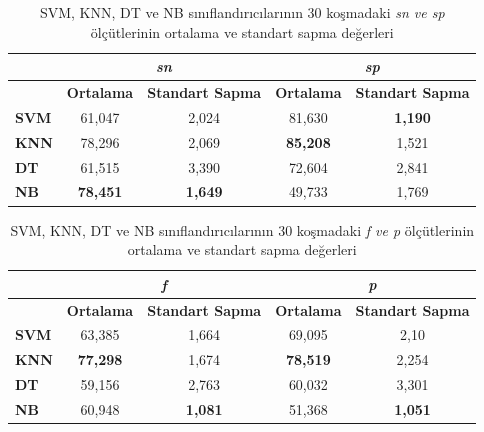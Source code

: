 \documentclass[conference]{IEEEtran}
\begin{document}
\begin{table}[h]
	\centering
	\begin{tabular}{|l|c|c|c|c|}
		\hline
		\multicolumn{1}{|c|}{} & \multicolumn{2}{c|}{\textit{\textbf{sn}}}      & \multicolumn{2}{c|}{\textit{\textbf{sp}}}      \\ \hline
		\multicolumn{1}{|c|}{} & \textbf{Ortalama}    & \textbf{Standart Sapma} & \textbf{Ortalama}    & \textbf{Standart Sapma} \\ \hline
		\textbf{SVM}           & 61,047          & 2,024             & 81,630          & \textbf{1,190}    \\ \hline
		\textbf{KNN}           & 78,296         & 2,069            & \textbf{85,208} & 1,521            \\ \hline
		\textbf{DT}            & 61,515          & 3,390              & 72,604           & 2,841            \\ \hline
		\textbf{NB}            & \textbf{78,451} & \textbf{1,649}    & 49,733         & 1,769             \\ \hline
	\end{tabular}
	\caption{SVM, KNN, DT ve NB sınıflandırıcılarının 30 koşmadaki \textit{sn ve sp} ölçütlerinin ortalama ve standart sapma değerleri}
	\label{tbl:SnSp}
\end{table}
%
\begin{table}[h]
	\centering
	\begin{tabular}{|l|c|c|c|c|}
		\hline
		\multicolumn{1}{|c|}{\textbf{}} & \multicolumn{2}{c|}{\textit{\textbf{f}}}       & \multicolumn{2}{c|}{\textit{\textbf{p}}}       \\ \hline
		\multicolumn{1}{|c|}{\textbf{}} & \textbf{Ortalama}    & \textbf{Standart Sapma} & \textbf{Ortalama}    & \textbf{Standart Sapma} \\ \hline
		\textbf{SVM}                    & 63,385          & 1,664             & 69,095        & 2,10             \\ \hline
		\textbf{KNN}                    & \textbf{77,298} & 1,674            & \textbf{78,519} & 2,254             \\ \hline
		\textbf{DT}                     & 59,156          & 2,763            & 60,032          & 3,301             \\ \hline
		\textbf{NB}                     & 60,948         & \textbf{1,081}    & 51,368          & \textbf{1,051}    \\ \hline
	\end{tabular}
	\caption{SVM, KNN, DT ve NB sınıflandırıcılarının 30 koşmadaki \textit{f ve p} ölçütlerinin ortalama ve standart sapma değerleri}
	\label{tbl:PF}
\end{table}
\end{document}
